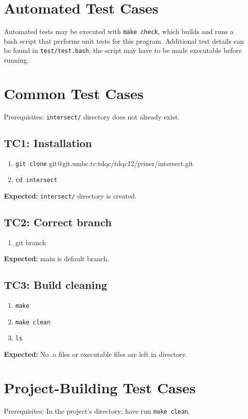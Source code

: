 \documentclass[11pt]{report}
\begin{document}
\section*{Automated Test Cases}
Automated tests may be executed with {\texttt{\color{red}make check}}, which builds and runs a bash script that performs unit tests for this program. Additional test details can be found in {\texttt{\color{red}test/test.bash}}; the script may have to be made executable before running.
\pagebreak
\section*{Common Test Cases}
Prerequisites: {\texttt{\color{red}intersect/}} directory does not already exist.
\subsection*{TC1: Installation}
\begin{enumerate}
  \item {\texttt{\color{red}git clone} {\color{blue}git@git.umbc.tc}}{\color{red}:tdqc/tdqc12/jviner/intersect.git}
  \item {\texttt{\color{red}cd intersect}}
\end{enumerate}
\textbf{Expected:} {\texttt{\color{red}intersect/}} directory is created.
\subsection*{TC2: Correct branch}
\begin{enumerate}
  \item {\color{red}git branch}
\end{enumerate}
\textbf{Expected:} {\color{red}main} is default branch.
\subsection*{TC3: Build cleaning}
\begin{enumerate}
  \item {\texttt{\color{red}make}}
  \item {\texttt{\color{red}make clean}}
  \item {\texttt{\color{red}ls}}
\end{enumerate}
\textbf{Expected:} No .o files or executable files are left in directory.
\pagebreak
\section*{Project-Building Test Cases}
Prerequisites: In the project's directory; have run {\texttt{\color{red}make clean}}.
\end{document}
